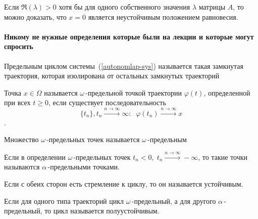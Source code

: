 \begin{lemmanote}
Если $\Re(\lambda) > 0$ хотя бы для одного собственного значения $\lambda$ матрицы $A$, то можно доказать, что $x = 0$ является неустойчивым положением равновесия.
\end{lemmanote}

\paragraph{Никому не нужные определения которые были на лекции и которые могут спросить}

\begin{definition}
Предельным циклом системы~(\ref{autonomlap-sys}) называется такая замкнутая траектория, которая изолирована от остальных замкнутых траекторий
\end{definition}

\begin{definition}
Точка $x \in \Omega$ называется $\omega$\,-предельной точкой траектории $\varphi(t)$, определенной при всех $t \geq 0$, если существует последовательность
\[
\{t_n\}, t_n \xrightarrow{n \rightarrow \infty} \infty: \;\;
\varphi(t_n) \xrightarrow{n \rightarrow \infty} x
\].
\end{definition}

\begin{definition}
Множество $\omega$\,-предельных точек называется $\omega$\,-предельным
\end{definition}

\begin{definition}
Если в определении $\omega$\,-предельных точек $t_n < 0,\; t_n \xrightarrow{n \rightarrow \infty}-\infty$, то такие точки называются $\alpha$\,-предельными точками. 
\end{definition}

\begin{definition}
Если с обеих сторон есть стремление к циклу, то он называется устойчивым. 
\end{definition}

\begin{definition}
Если для одного типа траекторий цикл $\omega$\,-предельный, а для другого $\alpha$\,-предельный, то цикл называется полуустойчивым.
\end{definition}
